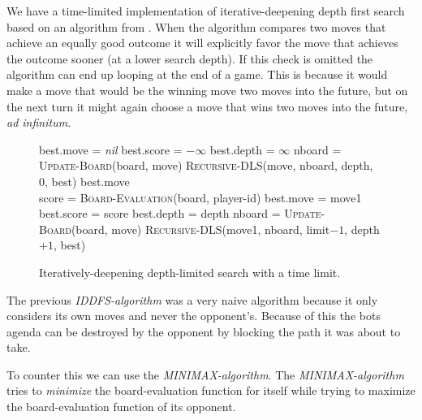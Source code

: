 \documentclass[a4paper,11pt]{article}
\begin{document}
We have a time-limited implementation of iterative-deepening depth
first search based on an algorithm from \cite{aimodern}. When the
algorithm compares two moves that achieve an equally good outcome it
will explicitly favor the move that achieves the outcome sooner (at a
lower search depth). If this check is omitted the algorithm can end up
looping at the end of a game. This is because it would make a move
that would be the winning move two moves into the future, but on the
next turn it might again choose a move that wins two moves into the
future, \emph{ad infinitum}.

\begin{figure}
\begin{algorithmic}
\State best.move = \emph{nil}
\State best.score = $-\infty$
\State best.depth = $\infty$
  \State nboard = \textsc{Update-Board}(board, move)
  \State \textsc{Recursive-DLS}(move, nboard, depth, 0, best)
 \EndFor
  \State \Return best.move
 \EndIf
\EndFor
\EndFunction
\\
\State score = \textsc{Board-Evaluation}(board, player-id)
\State best.move = move1
\State best.score = score
\State best.depth = depth
\EndIf
{}
\State \Return
\EndIf
{}
 \State nboard = \textsc{Update-Board}(board, move)
 \State \textsc{Recursive-DLS}(move1, nboard, limit$-1$, depth$+1$, best)
\EndFor
\EndFunction
\end{algorithmic}
\caption{Iteratively-deepening depth-limited search with a time limit.}
\end{figure}

The previous \emph{IDDFS-algorithm} was a very naive algorithm because it only
considers its own moves and never the opponent's. Because of this the bots
agenda can be destroyed by the opponent by blocking the path it was about
to take.

To counter this we can use the \emph{MINIMAX-algorithm}. The
\emph{MINIMAX-algorithm} tries to \emph{minimize} the board-evaluation function
for itself while trying to maximize the board-evaluation function of its
opponent.
\end{document}
